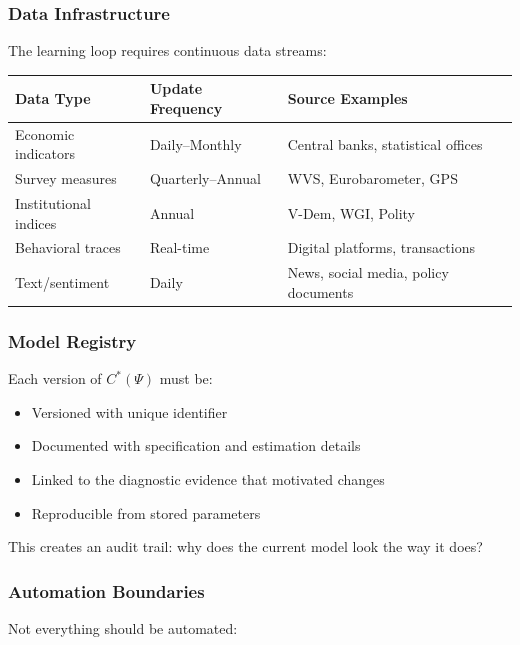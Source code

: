 \subsubsection{Data Infrastructure}

The learning loop requires continuous data streams:

\begin{center}
\renewcommand{\arraystretch}{1.3}
\begin{tabular}{|l|l|l|}
\hline
\textbf{Data Type} & \textbf{Update Frequency} & \textbf{Source Examples} \\
\hline
Economic indicators & Daily--Monthly & Central banks, statistical offices \\
Survey measures & Quarterly--Annual & WVS, Eurobarometer, GPS \\
Institutional indices & Annual & V-Dem, WGI, Polity \\
Behavioral traces & Real-time & Digital platforms, transactions \\
Text/sentiment & Daily & News, social media, policy documents \\
\hline
\end{tabular}
\end{center}

\subsubsection{Model Registry}

Each version of $C^*(\Psi)$ must be:
\begin{itemize}
    \item Versioned with unique identifier
    \item Documented with specification and estimation details
    \item Linked to the diagnostic evidence that motivated changes
    \item Reproducible from stored parameters
\end{itemize}

This creates an audit trail: why does the current model look the way it does?

\subsubsection{Automation Boundaries}

Not everything should be automated:

